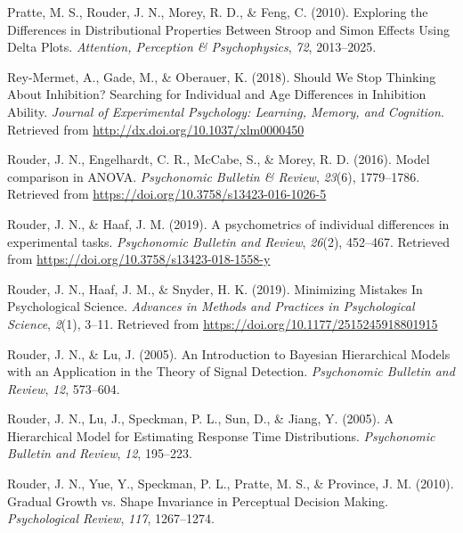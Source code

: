 \documentclass[
  ,man]{apa6}
\newlength{\cslhangindent}
\newlength{\cslentryspacingunit} %
\newenvironment{CSLReferences}[2] %
 {%
  \setlength{\parindent}{0pt}
  \ifodd #1
  \let\oldpar\par
  \def\par{\hangindent=\cslhangindent\oldpar}
  \fi
  \setlength{\parskip}{#2\cslentryspacingunit}
 }%
 {}
\begin{document}
\begin{CSLReferences}{1}{0}
\leavevmode{}%
Pratte, M. S., Rouder, J. N., Morey, R. D., \& Feng, C. (2010). Exploring the {Differences} in {Distributional Properties Between Stroop} and {Simon Effects Using Delta Plots}. \emph{Attention, Perception \& Psychophysics}, \emph{72}, 2013--2025.

\leavevmode{}%
Rey-Mermet, A., Gade, M., \& Oberauer, K. (2018). Should {We Stop Thinking About Inhibition}? {Searching} for {Individual} and {Age Differences} in {Inhibition Ability}. \emph{Journal of Experimental Psychology: Learning, Memory, and Cognition}. Retrieved from \url{http://dx.doi.org/10.1037/xlm0000450}

\leavevmode{}%
Rouder, J. N., Engelhardt, C. R., McCabe, S., \& Morey, R. D. (2016). Model comparison in {ANOVA}. \emph{Psychonomic Bulletin \& Review}, \emph{23}(6), 1779--1786. Retrieved from \url{https://doi.org/10.3758/s13423-016-1026-5}

\leavevmode{}%
Rouder, J. N., \& Haaf, J. M. (2019). A psychometrics of individual differences in experimental tasks. \emph{Psychonomic Bulletin and Review}, \emph{26}(2), 452--467. Retrieved from \url{https://doi.org/10.3758/s13423-018-1558-y}

\leavevmode{}%
Rouder, J. N., Haaf, J. M., \& Snyder, H. K. (2019). Minimizing {Mistakes In Psychological Science}. \emph{Advances in Methods and Practices in Psychological Science}, \emph{2}(1), 3--11. Retrieved from \url{https://doi.org/10.1177/2515245918801915}

\leavevmode{}%
Rouder, J. N., \& Lu, J. (2005). An {Introduction} to {Bayesian Hierarchical Models} with an {Application} in the {Theory} of {Signal Detection}. \emph{Psychonomic Bulletin and Review}, \emph{12}, 573--604.

\leavevmode{}%
Rouder, J. N., Lu, J., Speckman, P. L., Sun, D., \& Jiang, Y. (2005). A {Hierarchical Model} for {Estimating Response Time Distributions}. \emph{Psychonomic Bulletin and Review}, \emph{12}, 195--223.

\leavevmode{}%
Rouder, J. N., Yue, Y., Speckman, P. L., Pratte, M. S., \& Province, J. M. (2010). Gradual {Growth} vs. {Shape Invariance} in {Perceptual Decision Making}. \emph{Psychological Review}, \emph{117}, 1267--1274.


\end{CSLReferences}
\end{document}
